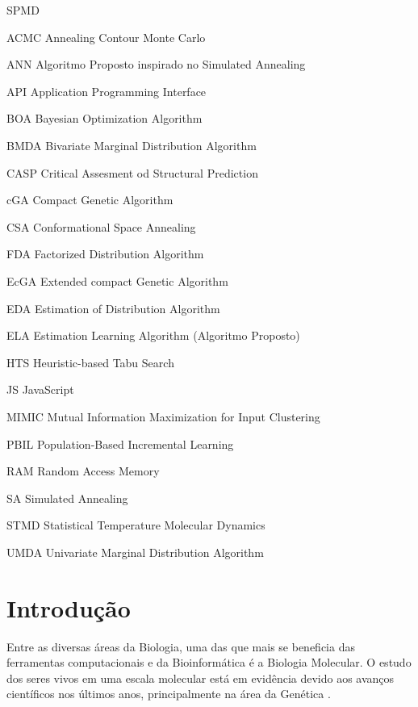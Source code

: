 \documentclass[dm,ppgcomp]{texfurg}
\begin{document}
\begin{listofabbrv}{SPMD}

\item[ACMC] Annealing Contour Monte Carlo
\item[ANN] Algoritmo Proposto inspirado no Simulated Annealing 
\item[API] Application Programming Interface
\item[BOA] Bayesian Optimization Algorithm
\item[BMDA] Bivariate Marginal Distribution Algorithm
\item[CASP] Critical Assesment od Structural Prediction
\item[cGA] Compact Genetic Algorithm
\item[CSA] Conformational Space Annealing
\item[FDA] Factorized Distribution Algorithm
\item[EcGA] Extended compact Genetic Algorithm
\item[EDA] Estimation of Distribution Algorithm
\item[ELA] Estimation Learning Algorithm (Algoritmo Proposto)
\item[HTS] Heuristic-based Tabu Search
\item[JS] JavaScript
\item[MIMIC] Mutual Information Maximization for Input Clustering
\item[PBIL] Population-Based Incremental Learning
\item[RAM] Random Access Memory
\item[SA] Simulated Annealing
\item[STMD] Statistical Temperature Molecular Dynamics
\item[UMDA] Univariate Marginal Distribution Algorithm

\end{listofabbrv}

\tableofcontents

\chapter{Introdução}

Entre as diversas áreas da Biologia, uma das que mais se beneficia das ferramentas computacionais e da Bioinformática é a Biologia Molecular. O estudo dos seres vivos em uma escala molecular está em evidência devido aos avanços científicos nos últimos anos, principalmente na área da Genética \cite{mount2004sequence}.
\end{document}
